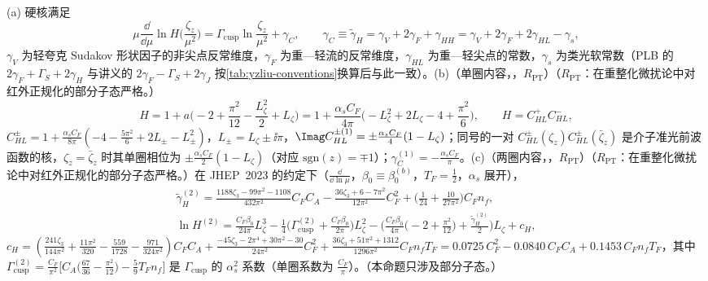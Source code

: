 \begin{proposition}\label{prop:yzliu-hard-kernel}
(a) 硬核满足
\begin{equation}\label{eq:yzliu-H-rge}
\mu\frac{\dd}{\dd\mu}\ln H\Big(\frac{\zeta_z}{\mu^2}\Big)=\Gamma_{\mathrm{cusp}}\ln\frac{\zeta_z}{\mu^2}+\gamma_C,\qquad \gamma_C\equiv\tilde\gamma_H=\gamma_V+2\gamma_F+\gamma_{HH}=\gamma_V+2\gamma_F+2\gamma_{HL}-\gamma_s ,
\end{equation}
$\gamma_V$ 为轻夸克 Sudakov 形状因子的非尖点反常维度，$\gamma_F$ 为重—轻流的反常维度，$\gamma_{HL}$ 为重—轻尖点的常数，$\gamma_s$ 为类光软常数\cite[式~(A.11)]{Ji:2023pba}（PLB 的 $2\gamma_F+\Gamma_S+2\gamma_H$ 与讲义的 $2\gamma_F-\Gamma_S+2\gamma_J$ 按\cref{tab:yzliu-conventions}换算后与此一致）。(b)（单圈内容，\tagR，$R_{\mathrm{PT}}$）（$R_{\mathrm{PT}}$：在重整化微扰论中对红外正规化的部分子态严格。）%
\begin{equation}\label{eq:yzliu-H1}
H=1+a\Big(-2+\frac{\pi^2}{12}-\frac{L_\zeta^2}{2}+L_\zeta\Big)=1+\frac{\alpha_sC_F}{4\pi}\Big(-L_\zeta^2+2L_\zeta-4+\frac{\pi^2}{6}\Big),\qquad H=C^+_{HL}C^-_{HL},
\end{equation}
$C^\pm_{HL}=1+\frac{\alpha_sC_F}{8\pi}(-4-\frac{5\pi^2}{6}+2L_\pm-L_\pm^2)$，$L_\pm=L_\zeta\pm\ii\pi$，$\Imag C^{\pm(1)}_{HL}=\pm\frac{\alpha_sC_F}{4}(1-L_\zeta)$；同号的一对 $C^\pm_{HL}(\zeta_z)C^\pm_{HL}(\bar\zeta_z)$ 是介子准光前波函数的核，$\zeta_z=\bar\zeta_z$ 时其单圈相位为 $\pm\frac{\alpha_sC_F}{2}(1-L_\zeta)$（对应 $\mathrm{sgn}(z)=\mp1$）；$\gamma^{(1)}_C=-\frac{\alpha_sC_F}{\pi}$。(c)（两圈内容，\tagR，$R_{\mathrm{PT}}$）（$R_{\mathrm{PT}}$：在重整化微扰论中对红外正规化的部分子态严格。）在 JHEP~2023 的约定下（$\frac{\dd}{\dd\ln\mu}$，$\beta_0\equiv\beta_0^{(b)}$，$T_F=\frac12$，$\alpha_s$ 展开），%
\begin{gather}
\tilde\gamma^{(2)}_H=\frac{1188\zeta_3-99\pi^2-1108}{432\pi^2}C_FC_A-\frac{36\zeta_3+6-7\pi^2}{12\pi^2}C_F^2+\Big(\frac1{24}+\frac{10}{27\pi^2}\Big)C_Fn_f,\label{eq:yzliu-gH2}\\
\ln H^{(2)}=\frac{C_F\beta_0}{24\pi}L_\zeta^3-\frac14\Big(\Gamma^{(2)}_{\mathrm{cusp}}+\frac{C_F\beta_0}{2\pi}\Big)L_\zeta^2-\Big(\frac{C_F\beta_0}{4\pi}\Big(-2+\frac{\pi^2}{12}\Big)+\frac{\tilde\gamma^{(2)}_H}{2}\Big)L_\zeta+c_H,\label{eq:yzliu-lnH2}
\end{gather}
$c_H=(\frac{241\zeta_3}{144\pi^2}+\frac{11\pi^2}{320}-\frac{559}{1728}-\frac{971}{324\pi^2})C_FC_A+\frac{-45\zeta_3-2\pi^4+30\pi^2-30}{24\pi^2}C_F^2+\frac{36\zeta_3+51\pi^2+1312}{1296\pi^2}C_Fn_fT_F=0.0725\,C_F^2-0.0840\,C_FC_A+0.1453\,C_Fn_fT_F$，其中 $\Gamma^{(2)}_{\mathrm{cusp}}=\frac{C_F}{\pi^2}\big[C_A\big(\frac{67}{36}-\frac{\pi^2}{12}\big)-\frac59T_Fn_f\big]$ 是 $\Gamma_{\mathrm{cusp}}$ 的 $\alpha_s^2$ 系数（单圈系数为 $\frac{C_F}{\pi}$）。（本命题只涉及部分子态。）
\end{proposition}

